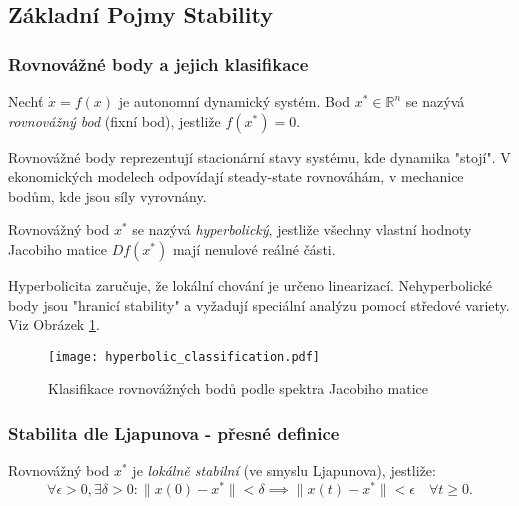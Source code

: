 \subsection{Základní Pojmy Stability}

\subsubsection{Rovnovážné body a jejich klasifikace}

\begin{definition}
Nechť $\dot{x} = f(x)$ je autonomní dynamický systém. Bod $x^* \in \mathbb{R}^n$ se nazývá \emph{rovnovážný bod} (fixní bod), jestliže $f(x^*) = 0$.
\end{definition}

\begin{intuition}
Rovnovážné body reprezentují stacionární stavy systému, kde dynamika "stojí". V ekonomických modelech odpovídají steady-state rovnováhám, v mechanice bodům, kde jsou síly vyrovnány.
\end{intuition}

\begin{definition}
Rovnovážný bod $x^*$ se nazývá \emph{hyperbolický}, jestliže všechny vlastní hodnoty Jacobiho matice $Df(x^*)$ mají nenulové reálné části.
\end{definition}

\begin{intuition}
Hyperbolicita zaručuje, že lokální chování je určeno linearizací. Nehyperbolické body jsou "hranicí stability" a vyžadují speciální analýzu pomocí středové variety. Viz Obrázek \ref{fig:hyperbolic_classification}.
\end{intuition}

\begin{figure}[H]
\centering
\texttt{[image: hyperbolic\_classification.pdf]}
\caption{Klasifikace rovnovážných bodů podle spektra Jacobiho matice}
\label{fig:hyperbolic_classification}
\end{figure}

\subsubsection{Stabilita dle Ljapunova - přesné definice}

\begin{definition}
Rovnovážný bod $x^*$ je \emph{lokálně stabilní} (ve smyslu Ljapunova), jestliže:
\[
\forall \epsilon > 0, \exists \delta > 0: \|x(0) - x^*\| < \delta \implies \|x(t) - x^*\| < \epsilon \quad \forall t \geq 0.
\]
\end{definition}


